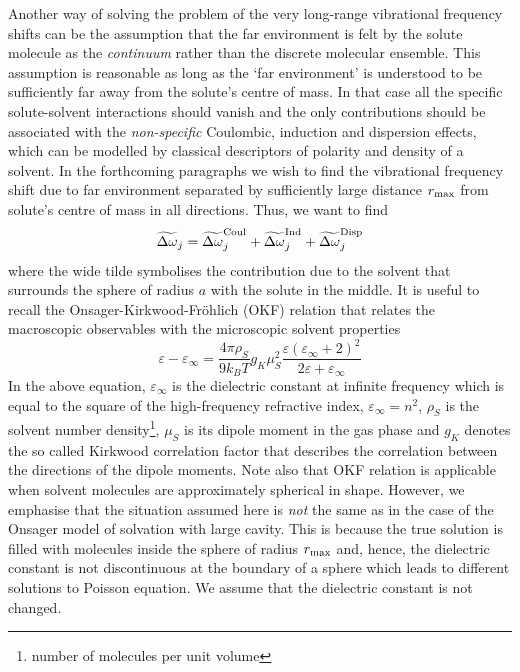 \documentclass[a4paper,titlepage,twoside,fleqn,12pt]{book}
\begin{document}
\begin{refsection}
Another way of solving the problem of the very long\hyp{}range
vibrational frequency shifts can be the assumption that the
far environment is felt by the solute molecule as the \emph{continuum}
rather than the discrete molecular ensemble. This assumption
is reasonable as long as the `far environment'
is understood to be sufficiently far away from the solute's
centre of mass. In that case all the specific solute\hyp{}solvent
interactions should vanish and the only contributions should be
associated with the \emph{non\hyp{}specific} Coulombic, induction and dispersion
effects,
which can be modelled by classical descriptors of polarity and 
density of a solvent. In the forthcoming paragraphs we wish to find the
vibrational frequency shift due to far environment separated
by sufficiently large distance $r_{\rm max}$ from solute's centre of mass
in all directions. Thus, we want to find
%
\begin{equation}
 \widetilde{\Delta\omega}_j = 
\widetilde{\Delta\omega}_j^{\rm Coul} +
\widetilde{\Delta\omega}_j^{\rm Ind} +
\widetilde{\Delta\omega}_j^{\rm Disp}
\end{equation}
%
where the wide tilde symbolises the contribution
due to the solvent
that surrounds the sphere of radius $a$ with the solute
in the middle. It is useful to recall 
the Onsager\hyp{}Kirkwood\hyp{}Fr{\"o}hlich (OKF) relation \citep{Valisko.Boda.JPCB.2005}
that relates the macroscopic observables with the microscopic 
solvent properties
%
\begin{equation} \label{e:OKF}
 \varepsilon - \varepsilon_\infty = \frac{4\pi\rho_S}{9k_BT}g_K\mu_S^2 
\frac{\varepsilon(\varepsilon_\infty+2)^2}{2\varepsilon+\varepsilon_\infty}
\end{equation}
%
In the above equation, $\varepsilon_\infty$ is the dielectric constant
at infinite frequency which is equal to the square 
of the high\hyp{}frequency refractive index, $\varepsilon_\infty=n^2$, 
$\rho_S$ is the solvent number density\footnote{number of molecules
per unit volume}, $\mu_S$ is
its dipole moment in the gas phase and $g_K$ denotes the so called
Kirkwood correlation factor \citep{Reis.Iglesias.PCCP.2011} 
that describes the correlation between
the directions of the dipole moments. Note also that 
OKF relation is applicable
when solvent molecules are approximately spherical in shape.
However, we emphasise that the situation assumed here
is \emph{not} the same as in the case of the Onsager model of solvation
with large cavity. This is because the true solution is filled with
molecules inside the sphere of radius $r_{\rm max}$ and, hence, the dielectric constant
is not discontinuous at the boundary of a sphere which leads to different
solutions to Poisson equation. We assume that the dielectric constant is not
changed.


\end{refsection}
\end{document}

